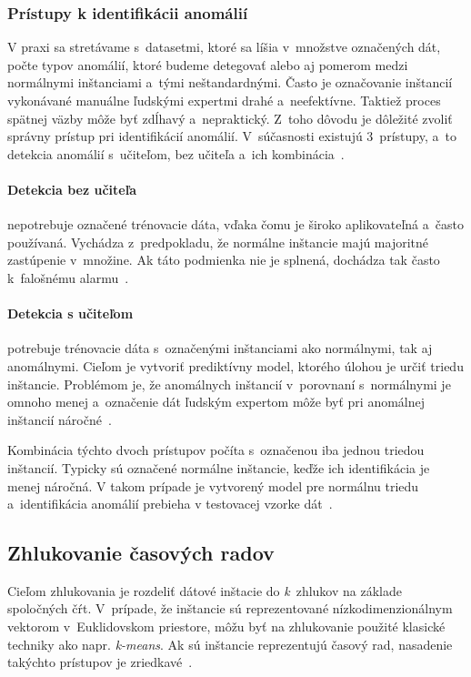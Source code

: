 \documentclass[a4paper,twoside,slovak,12pt]{article}
\begin{document}
\subsubsection{Prístupy k identifikácii anomálií}
V praxi sa stretávame s~datasetmi, ktoré sa líšia v~množstve označených dát,
počte typov anomálií, ktoré budeme detegovať alebo aj pomerom medzi normálnymi
inštanciami a~tými neštandardnými. Často je označovanie inštancií vykonávané
manuálne ľudskými expertmi drahé a~neefektívne. Taktiež proces spätnej väzby
môže byť zdĺhavý a~nepraktický. Z~toho dôvodu je dôležité zvoliť správny
prístup pri identifikácií anomálií. V~súčasnosti existujú 3~prístupy, a~to
detekcia anomálií s~učiteľom, bez učiteľa a~ich kombinácia~\cite{Chandola2009}.

\paragraph{Detekcia bez učiteľa} nepotrebuje označené trénovacie dáta, vďaka
čomu je široko aplikovateľná a~často používaná. Vychádza z~predpokladu, že
normálne inštancie majú majoritné zastúpenie v~množine. Ak táto podmienka nie je
splnená, dochádza tak často k~falošnému alarmu~\cite{Chandola2009}.

\paragraph{Detekcia s učiteľom} potrebuje trénovacie dáta s~označenými
inštanciami ako normálnymi, tak aj anomálnymi. Cieľom je vytvoriť prediktívny
model, ktorého úlohou je určiť triedu inštancie. Problémom je, že anomálnych
inštancií v~porovnaní s~normálnymi je omnoho menej a~označenie dát ľudským
expertom môže byť pri anomálnej inštancií náročné~\cite{Chandola2009}.

Kombinácia týchto dvoch prístupov počíta s~označenou iba jednou triedou
inštancií. Typicky sú označené normálne inštancie, keďže ich identifikácia je
menej náročná. V takom prípade je vytvorený model pre normálnu triedu
a~identifikácia anomálií prebieha v testovacej vzorke dát~\cite{Chandola2009}.


\subsection{Zhlukovanie časových radov}
Cieľom zhlukovania je rozdeliť dátové inštacie do \textit{k}~zhlukov na základe
spoločných čŕt. V~prípade, že inštancie sú reprezentované nízkodimenzionálnym
vektorom v~Euklidovskom priestore, môžu byť na zhlukovanie použité klasické
techniky ako napr. \textit{k-means}. Ak sú inštancie reprezentujú časový rad,
nasadenie takýchto prístupov je zriedkavé~\cite{Hautamaki2008}.
\end{document}
